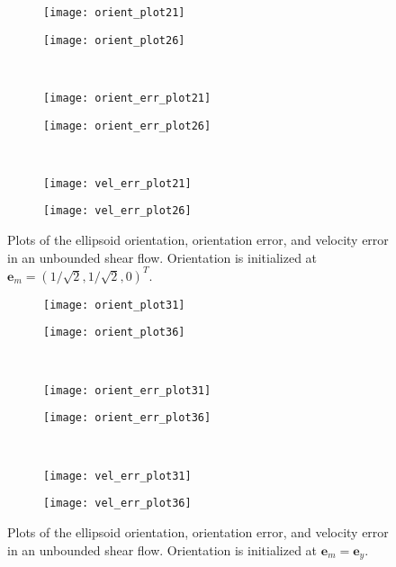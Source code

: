 \documentclass{article}
\newcommand{\vect}[1]{\boldsymbol{\mathbf{#1}}}
\begin{document}
\begin{figure}
  \centering
  \begin{subfigure}{0.49\textwidth}
    \texttt{[image: orient\_plot21]}
  \end{subfigure}
  \hfill
  \begin{subfigure}{0.49\textwidth}
    \texttt{[image: orient\_plot26]}
  \end{subfigure}
  \\
  \begin{subfigure}{0.49\textwidth}
    \texttt{[image: orient\_err\_plot21]}
  \end{subfigure}
  \hfill
  \begin{subfigure}{0.49\textwidth}
    \texttt{[image: orient\_err\_plot26]}
  \end{subfigure}
  \\
  \begin{subfigure}{0.49\textwidth}
    \texttt{[image: vel\_err\_plot21]}
  \end{subfigure}
  \hfill
  \begin{subfigure}{0.49\textwidth}
    \texttt{[image: vel\_err\_plot26]}
  \end{subfigure}
  \caption{Plots of the ellipsoid orientation, orientation error, and
    velocity error in an unbounded shear flow. Orientation is
    initialized at $\vect{e}_m = (1/\sqrt{2}, 1/\sqrt{2}, 0)^T$.}
  \label{fig:second-free-test}
\end{figure}

\begin{figure}
  \centering
  \begin{subfigure}{0.49\textwidth}
    \texttt{[image: orient\_plot31]}
  \end{subfigure}
  \hfill
  \begin{subfigure}{0.49\textwidth}
    \texttt{[image: orient\_plot36]}
  \end{subfigure}
  \\
  \begin{subfigure}{0.49\textwidth}
    \texttt{[image: orient\_err\_plot31]}
  \end{subfigure}
  \hfill
  \begin{subfigure}{0.49\textwidth}
    \texttt{[image: orient\_err\_plot36]}
  \end{subfigure}
  \\
  \begin{subfigure}{0.49\textwidth}
    \texttt{[image: vel\_err\_plot31]}
  \end{subfigure}
  \hfill
  \begin{subfigure}{0.49\textwidth}
    \texttt{[image: vel\_err\_plot36]}
  \end{subfigure}
  \caption{Plots of the ellipsoid orientation, orientation error, and
    velocity error in an unbounded shear flow. Orientation is
    initialized at $\vect{e}_m = \vect{e}_y$.}
  \label{fig:third-free-test}
\end{figure}
\end{document}
